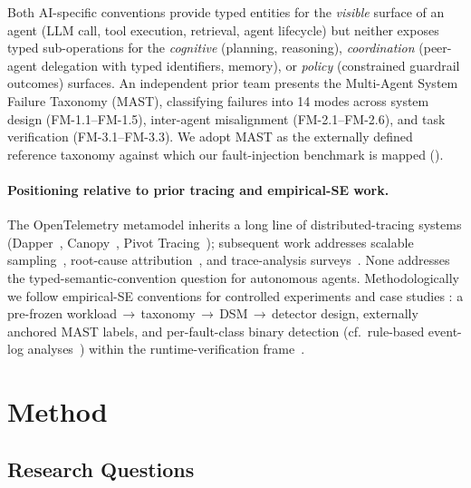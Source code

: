 \documentclass[a4paper,UKenglish,cleveref,autoref,thm-restate]{lipics-v2021}
\begin{document}
Both AI-specific conventions provide typed entities for the
\emph{visible} surface of an agent (LLM call, tool execution,
retrieval, agent lifecycle) but neither exposes typed sub-operations
for the \emph{cognitive} (planning, reasoning), \emph{coordination}
(peer-agent delegation with typed identifiers, memory), or
\emph{policy} (constrained guardrail outcomes) surfaces.  An
independent prior team \cite{anon-mast} presents the Multi-Agent
System Failure Taxonomy (MAST), classifying failures into 14 modes
across system design (FM-1.1--FM-1.5), inter-agent misalignment
(FM-2.1--FM-2.6), and task verification (FM-3.1--FM-3.3).  We adopt
MAST as the externally defined reference taxonomy against which our
fault-injection benchmark is mapped ().

\paragraph*{Positioning relative to prior tracing and empirical-SE work.}
The OpenTelemetry metamodel inherits a long line of distributed-tracing
systems (Dapper~\cite{anon-dapper}, Canopy~\cite{anon-canopy}, Pivot
Tracing~\cite{anon-pivottracing}); subsequent work addresses scalable
sampling~\cite{anon-sifter}, root-cause attribution~\cite{anon-xray},
and trace-analysis surveys~\cite{anon-tracingsurvey}. None addresses
the typed-semantic-convention question for autonomous agents.
Methodologically we follow empirical-SE conventions for controlled
experiments and case studies \cite{anon-wohlin,anon-runeson}: a
pre-frozen workload\,$\to$\,taxonomy\,$\to$\,DSM\,$\to$\,detector
design, externally anchored MAST labels, and per-fault-class binary
detection (cf.\ rule-based event-log analyses~\cite{anon-cinque})
within the runtime-verification frame~\cite{anon-rv}.

\section{Method}
\label{sec:method}

\subsection{Research Questions}
\end{document}
